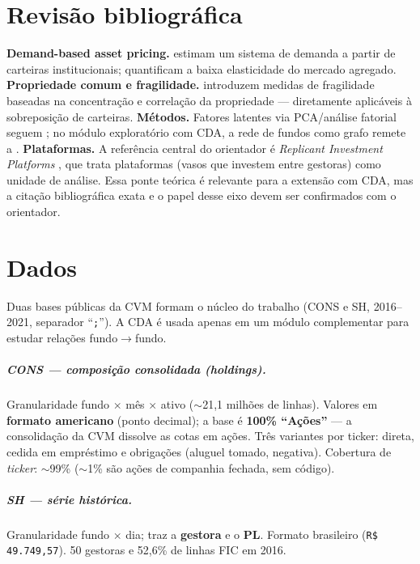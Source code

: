 \documentclass[12pt,a4paper]{report}
\begin{document}
\chapter{Revisão bibliográfica}\label{cap:rev}
\textbf{Demand-based asset pricing.} \citet{koijenyogo2019} estimam um sistema de demanda a partir de
carteiras institucionais; \citet{gabaixkoijen2021} quantificam a baixa elasticidade do mercado agregado.
\textbf{Propriedade comum e fragilidade.} \citet{greenwoodthesmar2011} introduzem medidas de fragilidade
baseadas na concentração e correlação da propriedade --- diretamente aplicáveis à sobreposição de carteiras.
\textbf{Métodos.} Fatores latentes via PCA/análise fatorial seguem \citet[cap.\ 3--4]{artesbarroso2023}; no
módulo exploratório com CDA, a rede de fundos como grafo remete a \citet{sanchezlengeling2021}.
\textbf{Plataformas.} A referência central do orientador é \emph{Replicant Investment Platforms}
\citep{ferraresi_replicant}, que trata plataformas (vasos que investem entre gestoras) como unidade de
análise. Essa ponte teórica é relevante para a extensão com CDA, mas a citação bibliográfica exata e o papel
desse eixo devem ser confirmados com o orientador.

\chapter{Dados}\label{cap:dados}
Duas bases públicas da CVM formam o núcleo do trabalho (CONS e SH, 2016--2021, separador ``\texttt{;}'').
A CDA é usada apenas em um módulo complementar para estudar relações fundo$\to$fundo.

\paragraph{CONS --- composição consolidada (\emph{holdings}).} Granularidade fundo $\times$ mês $\times$
ativo ($\sim$21,1 milhões de linhas). Valores em \textbf{formato americano} (ponto decimal); a base é
\textbf{100\% ``Ações''} --- a consolidação da CVM dissolve as cotas em ações. Três variantes por ticker:
direta, cedida em empréstimo e obrigações (aluguel tomado, negativa). Cobertura de \emph{ticker}: $\sim$99\%
($\sim$1\% são ações de companhia fechada, sem código).

\paragraph{SH --- série histórica.} Granularidade fundo $\times$ dia; traz a \textbf{gestora} e o \textbf{PL}.
Formato brasileiro (\texttt{R\$ 49.749,57}). 50 gestoras e 52,6\% de linhas FIC em 2016.
\end{document}
